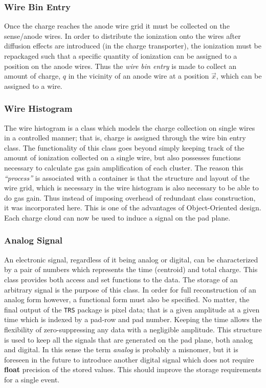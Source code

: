 \documentclass[twoside]{article}
\newcommand{\comp}[1]{\texttt{#1}}%
\begin{document}
\subsubsection{Wire Bin Entry}
\label{sec:wireBin}

Once the charge reaches the anode wire grid it must be collected on
the sense/anode wires.  In order to distribute the ionization onto
the wires after diffusion effects are introduced 
(in the charge transporter), the ionization must be repackaged 
such that a specific quantity of
ionization can be assigned to a position on the anode wires.  Thus the
{\em wire bin entry} is made to collect an amount of charge, $q$ in the vicinity of
an anode wire at a position $\vec{x}$, which can be assigned to a wire.

\subsubsection{Wire Histogram}
\label{sec:wireHistogram}

The wire histogram is a class which models the charge collection on single
wires in a controlled manner; that is, charge is assigned through the
wire bin entry class.  The functionality of this class goes beyond
simply keeping track of the amount of ionization collected on a single
wire, but also possesses functions necessary to calculate gas gain
amplification of each cluster.  The reason this {\em ``process''} is associated
with a container is that the structure and layout of the wire grid,
which is necessary in the wire histogram is also necessary to be
able to do gas gain.  Thus instead of imposing overhead of redundant
class construction, it was incorporated here.  This is one of the advantages
of Object-Oriented design.  Each charge cloud can now be used to
induce a signal on the pad plane.

\subsubsection{Analog Signal}
\label{sec:analogSignal}

An electronic signal, regardless of it being analog or digital,
can be characterized by a pair of numbers which represents the
time (centroid) and total charge.  This class provides both access and
set functions to the data.  The storage of an
arbitrary signal is the purpose of this class.  In order for full
reconstruction of an analog form however, a functional form must also
be specified.  No matter, the final output of the \comp{TRS} package
is pixel data; that is a given amplitude at a given time which is
indexed by a pad-row and pad number.  Keeping the time allows the
flexibility of zero-suppressing any data with a negligible amplitude.
This structure is used to keep all the signals that are generated on the
pad plane, both analog and digital.  In this sense the term {\em analog}
is probably a misnomer, but it is foreseen in the future to introduce
another digital signal which does not require {\bf float} precision of
the stored values.  This should improve the storage requirements for
a single event.  
\end{document}
